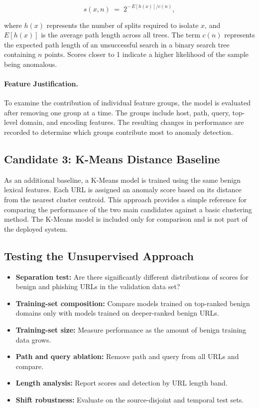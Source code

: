 \documentclass{FastFyp}
\begin{document}
\begin{equation}
s(x,n) \;=\; 2^{-\,E[h(x)]/c(n)},
\end{equation}

where $h(x)$ represents the number of splits required to isolate $x$, and $E[h(x)]$ is the average path length across all trees. The term $c(n)$ represents the expected path length of an unsuccessful search in a binary search tree containing $n$ points. Scores closer to 1 indicate a higher likelihood of the sample being anomalous.

\paragraph{Feature Justification.} To examine the contribution of individual feature groups, the model is evaluated after removing one group at a time. The groups include host, path, query, top-level domain, and encoding features. The resulting changes in performance are recorded to determine which groups contribute most to anomaly detection.

\subsection{Candidate 3: K-Means Distance Baseline}

As an additional baseline, a K-Means model is trained using the same benign lexical features. Each URL is assigned an anomaly score based on its distance from the nearest cluster centroid. This approach provides a simple reference for comparing the performance of the two main candidates against a basic clustering method. The K-Means model is included only for comparison and is not part of the deployed system.

\subsection{Testing the Unsupervised Approach}
\begin{itemize}
    \item \textbf{Separation test:} Are there significantly different distributions of scores for benign and phishing URLs in the validation data set?
    \item \textbf{Training-set composition:} Compare models trained on top-ranked benign domains only with models trained on deeper-ranked benign URLs.
    \item \textbf{Training-set size:} Measure performance as the amount of benign training data grows.
    \item \textbf{Path and query ablation:} Remove path and query from all URLs and compare.
    \item \textbf{Length analysis:} Report scores and detection by URL length band.
    \item \textbf{Shift robustness:} Evaluate on the source-disjoint and temporal test sets.
\end{itemize}
\end{document}
